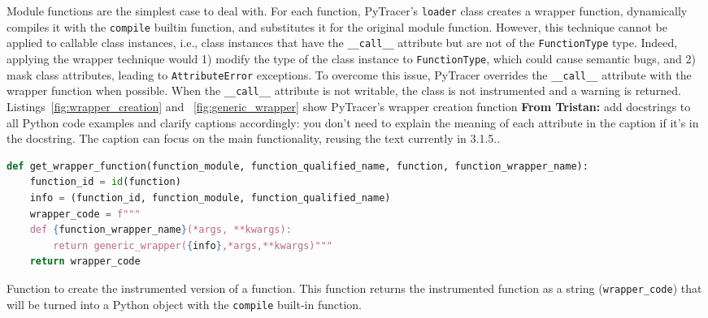 \documentclass[11pt]{article}
\newcommand{\tristan}[1]{\color{orange}\textbf{From Tristan:} #1\color{black}\xspace}
\newcommand{\pytracer}[0]{PyTracer\xspace}
\begin{document}
Module functions are the simplest case to deal with.
For each function, \pytracer's \texttt{loader} class
creates a wrapper function, dynamically compiles it with the \texttt{compile}
builtin function, and substitutes it for the original module function.
However, this technique cannot be applied to
callable class instances, i.e., class instances that have the \texttt{\_\_call\_\_} attribute but are not of the \texttt{FunctionType} type.
Indeed, applying the wrapper technique would 1) modify the type of the class instance to \texttt{FunctionType},
which could cause semantic bugs, and 2) mask class attributes, leading to \texttt{AttributeError} exceptions.
To overcome this issue, \pytracer overrides the \texttt{\_\_call\_\_} attribute with the wrapper function when 
possible. When the \texttt{\_\_call\_\_} attribute is not writable,  
the class is not instrumented and a warning is returned. Listings~\ref{fig:wrapper_creation} and ~\ref{fig:generic_wrapper} show \pytracer's wrapper creation function \tristan{add docstrings to all Python code examples and clarify captions accordingly: you don't need to explain the meaning of each attribute in the caption if it's in the docstring. The caption can focus on the main functionality, reusing the text currently in 3.1.5.}.

%




\begin{listing}
    \centering
\begin{lstlisting}[language=Python,style=customPython]
def get_wrapper_function(function_module, function_qualified_name, function, function_wrapper_name):
    function_id = id(function)
    info = (function_id, function_module, function_qualified_name)
    wrapper_code = f"""
    def {function_wrapper_name}(*args, **kwargs):
        return generic_wrapper({info},*args,**kwargs)"""
    return wrapper_code
\end{lstlisting}
    \caption{Function to create the instrumented version of a function. 
    This function returns the instrumented function as a string (\texttt{wrapper\_code}) that 
    will be turned into a Python object with the \texttt{compile} built-in function.}
    \label{fig:wrapper_creation}
\end{listing}
\end{document}
